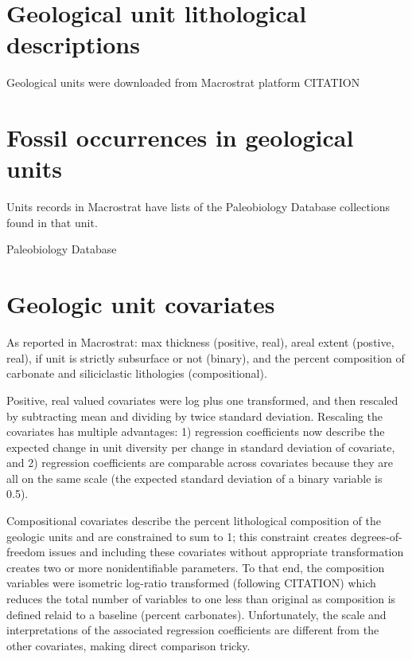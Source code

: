 \documentclass[12pt,letterpaper]{article}
\begin{document}
\section{Geological unit lithological descriptions}
Geological units were downloaded from Macrostrat platform CITATION 


\section{Fossil occurrences in geological units}
Units records in Macrostrat have lists of the Paleobiology Database collections found in that unit. 


Paleobiology Database




\section{Geologic unit covariates}


As reported in Macrostrat: max thickness (positive, real), areal extent (postive, real),
if unit is strictly subsurface or not (binary), and 
the percent composition of carbonate and siliciclastic lithologies (compositional). 

Positive, real valued covariates were log plus one transformed, and then rescaled by subtracting mean and dividing by twice standard deviation. Rescaling the covariates has multiple advantages: 1) regression coefficients now describe the expected change in unit diversity per change in standard deviation of covariate, and 2) regression coefficients are comparable across covariates because they are all on the same scale (the expected standard deviation of a binary variable is 0.5).

Compositional covariates describe the percent lithological composition of the geologic units and are constrained to sum to 1; this constraint creates degrees-of-freedom issues and including these covariates without appropriate transformation creates two or more nonidentifiable parameters. To that end, the composition variables were isometric log-ratio transformed (following CITATION) which reduces the total number of variables to one less than original as composition is defined relaid to a baseline (percent carbonates). Unfortunately, the scale and interpretations of the associated regression coefficients are different from the other covariates, making direct comparison tricky.
\end{document}
